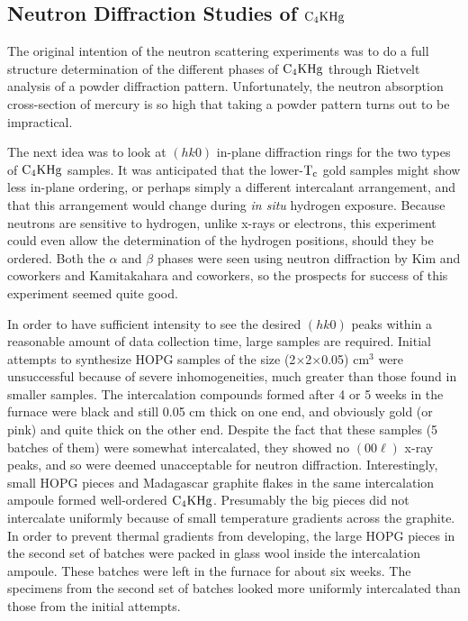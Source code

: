 \subsection{Neutron Diffraction Studies of $\rm C_4KHg$}
\label{neutrons}

        The original intention of the neutron scattering experiments was to
do a  full structure determination of  the different phases of $\rm C_4KHg$
through Rietvelt analysis of  a powder diffraction pattern.  Unfortunately,
the  neutron absorption cross-section of mercury  is so high that  taking a
powder pattern turns  out to be impractical.\cite{neumann88}

        The next idea was to look at $(hk0)$ in-plane diffraction rings for
the  two  types  of $\rm C_4KHg$  samples.    It was   anticipated that the
lower-$\rm T_c$ gold samples might show less in-plane  ordering, or perhaps
simply a different intercalant arrangement, and that this arrangement would
change during {\em in  situ \/} hydrogen  exposure.   Because neutrons  are
sensitive to  hydrogen, unlike x-rays  or electrons, this experiment could
even allow the   determination of the hydrogen positions,   should they  be
ordered.  Both  the  $\alpha$ and $\beta$  phases  were seen  using neutron
diffraction   by Kim  and   coworkers\cite{kim84}  and  Kamitakahara    and
coworkers,\cite{kamitakahara84b}  so the   prospects for success   of  this
experiment seemed quite good.

        In  order to have  sufficient intensity to see the  desired $(hk0)$
peaks within a reasonable amount of data collection time, large samples are
required.  Initial attempts    to  synthesize HOPG  samples  of   the  size
(2$\times$2$\times$0.05)   cm$^3$  were   unsuccessful  because  of  severe
inhomogeneities, much  greater  than those  found in smaller samples.   The
intercalation compounds formed after 4 or 5 weeks in the furnace were black
and still 0.05 cm thick on one end, and obviously gold  (or pink) and quite
thick on the other end.  Despite the fact that these  samples (5 batches of
them) were somewhat  intercalated, they showed  no $(00\ell)$ x-ray  peaks,
and so were deemed unacceptable  for neutron  diffraction.   Interestingly,
small HOPG pieces and Madagascar graphite flakes in the  same intercalation
ampoule  formed well-ordered $\rm C_4KHg$.   Presumably  the big pieces did
not intercalate uniformly because of small temperature gradients across the
graphite.  In order to prevent thermal gradients from developing, the large
HOPG pieces in the second set of  batches  were packed in glass wool inside
the  intercalation ampoule.   These batches were   left in  the furnace for
about six weeks.  The specimens from the  second set of batches looked more
uniformly intercalated than those from the initial attempts.

